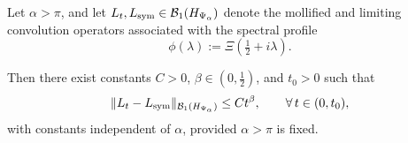\begin{lemma}
\label{lem:trace_norm_rate_convergence}
Let \( \alpha > \pi \), and let \( L_t, L_{\mathrm{sym}} \in \mathcal{B}_1(H_{\Psi_\alpha}) \) denote the mollified and limiting convolution operators associated with the spectral profile
\[
\phi(\lambda) := \Xi\left( \tfrac{1}{2} + i\lambda \right).
\]

Then there exist constants \( C > 0 \), \( \beta \in (0, \tfrac{1}{2}) \), and \( t_0 > 0 \) such that
\[
\| L_t - L_{\mathrm{sym}} \|_{\mathcal{B}_1(H_{\Psi_\alpha})} \le C t^\beta, \qquad \forall\, t \in (0, t_0),
\]
with constants independent of \( \alpha \), provided \( \alpha > \pi \) is fixed.
\end{lemma}
